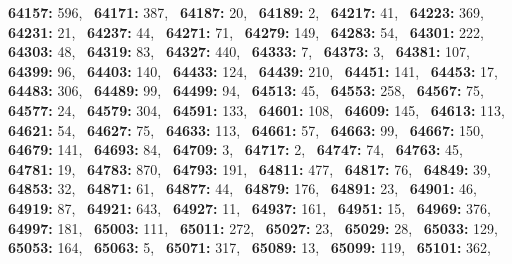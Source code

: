 \textbf{64157:} 596,\allowbreak~ 
\textbf{64171:} 387,\allowbreak~ 
\textbf{64187:} 20,\allowbreak~ 
\textbf{64189:} 2,\allowbreak~ 
\textbf{64217:} 41,\allowbreak~ 
\textbf{64223:} 369,\allowbreak~ 
\textbf{64231:} 21,\allowbreak~ 
\textbf{64237:} 44,\allowbreak~ 
\textbf{64271:} 71,\allowbreak~ 
\textbf{64279:} 149,\allowbreak~ 
\textbf{64283:} 54,\allowbreak~ 
\textbf{64301:} 222,\allowbreak~ 
\textbf{64303:} 48,\allowbreak~ 
\textbf{64319:} 83,\allowbreak~ 
\textbf{64327:} 440,\allowbreak~ 
\textbf{64333:} 7,\allowbreak~ 
\textbf{64373:} 3,\allowbreak~ 
\textbf{64381:} 107,\allowbreak~ 
\textbf{64399:} 96,\allowbreak~ 
\textbf{64403:} 140,\allowbreak~ 
\textbf{64433:} 124,\allowbreak~ 
\textbf{64439:} 210,\allowbreak~ 
\textbf{64451:} 141,\allowbreak~ 
\textbf{64453:} 17,\allowbreak~ 
\textbf{64483:} 306,\allowbreak~ 
\textbf{64489:} 99,\allowbreak~ 
\textbf{64499:} 94,\allowbreak~ 
\textbf{64513:} 45,\allowbreak~ 
\textbf{64553:} 258,\allowbreak~ 
\textbf{64567:} 75,\allowbreak~ 
\textbf{64577:} 24,\allowbreak~ 
\textbf{64579:} 304,\allowbreak~ 
\textbf{64591:} 133,\allowbreak~ 
\textbf{64601:} 108,\allowbreak~ 
\textbf{64609:} 145,\allowbreak~ 
\textbf{64613:} 113,\allowbreak~ 
\textbf{64621:} 54,\allowbreak~ 
\textbf{64627:} 75,\allowbreak~ 
\textbf{64633:} 113,\allowbreak~ 
\textbf{64661:} 57,\allowbreak~ 
\textbf{64663:} 99,\allowbreak~ 
\textbf{64667:} 150,\allowbreak~ 
\textbf{64679:} 141,\allowbreak~ 
\textbf{64693:} 84,\allowbreak~ 
\textbf{64709:} 3,\allowbreak~ 
\textbf{64717:} 2,\allowbreak~ 
\textbf{64747:} 74,\allowbreak~ 
\textbf{64763:} 45,\allowbreak~ 
\textbf{64781:} 19,\allowbreak~ 
\textbf{64783:} 870,\allowbreak~ 
\textbf{64793:} 191,\allowbreak~ 
\textbf{64811:} 477,\allowbreak~ 
\textbf{64817:} 76,\allowbreak~ 
\textbf{64849:} 39,\allowbreak~ 
\textbf{64853:} 32,\allowbreak~ 
\textbf{64871:} 61,\allowbreak~ 
\textbf{64877:} 44,\allowbreak~ 
\textbf{64879:} 176,\allowbreak~ 
\textbf{64891:} 23,\allowbreak~ 
\textbf{64901:} 46,\allowbreak~ 
\textbf{64919:} 87,\allowbreak~ 
\textbf{64921:} 643,\allowbreak~ 
\textbf{64927:} 11,\allowbreak~ 
\textbf{64937:} 161,\allowbreak~ 
\textbf{64951:} 15,\allowbreak~ 
\textbf{64969:} 376,\allowbreak~ 
\textbf{64997:} 181,\allowbreak~ 
\textbf{65003:} 111,\allowbreak~ 
\textbf{65011:} 272,\allowbreak~ 
\textbf{65027:} 23,\allowbreak~ 
\textbf{65029:} 28,\allowbreak~ 
\textbf{65033:} 129,\allowbreak~ 
\textbf{65053:} 164,\allowbreak~ 
\textbf{65063:} 5,\allowbreak~ 
\textbf{65071:} 317,\allowbreak~ 
\textbf{65089:} 13,\allowbreak~ 
\textbf{65099:} 119,\allowbreak~ 
\textbf{65101:} 362,\allowbreak~ 
